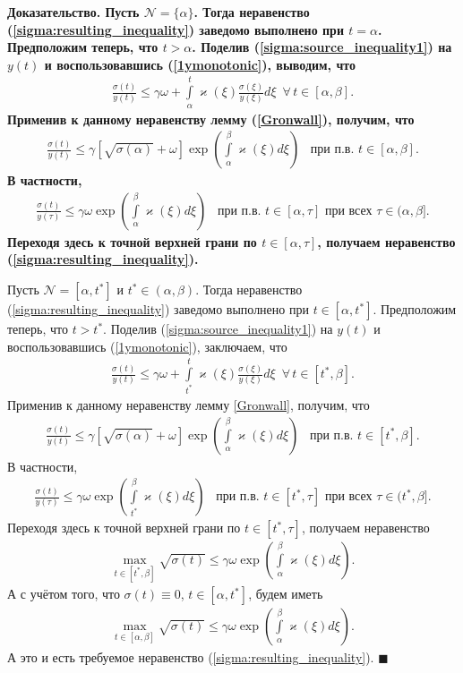 \documentclass{report}
\newenvironment{Proof}{\par\noindent\bf Доказательство.\rm}{ $\blacksquare$\par}
\begin{document}
\begin{Proof}
Пусть $\mathcal{N}=\{\alpha\}$. Тогда неравенство (\ref{sigma:resulting_inequality}) заведомо выполнено при $t=\alpha$. Предположим теперь, что $t>\alpha$.  Поделив
(\ref{sigma:source_inequality1}) на $y(t)$ и воспользовавшись (\ref{1ymonotonic}), выводим, что
\begin{gather*}
\frac{\sigma(t)}{y(t)}\leqslant\gamma\omega+\int\limits_\alpha^t\varkappa(\xi)\frac{\sigma(\xi)}{y(\xi)}d\xi\,\,\,\forall\,t\in[\alpha,\beta].
\end{gather*}
Применив к данному неравенству лемму (\ref{Gronwall}), получим, что
\begin{gather*}
\frac{\sigma(t)}{y(t)}\leqslant\gamma[\sqrt{\sigma(\alpha)}+\omega] \exp\left(\int\limits_\alpha^\beta\varkappa(\xi)d\xi\right)\,\,\,\mbox{ при п.в. $t\in[\alpha,\beta]$}.
\end{gather*}
В частности,
\begin{gather*}
\frac{\sigma(t)}{y(\tau)}\leqslant\gamma\omega \exp\left(\int\limits_\alpha^\beta\varkappa(\xi)d\xi\right)\,\,\,\mbox{ при п.в. $t\in[\alpha,\tau]$ при всех $\tau\in(\alpha,\beta]$}.
\end{gather*}
Переходя здесь к точной верхней грани по $t\in[\alpha,\tau]$, получаем неравенство (\ref{sigma:resulting_inequality}).

Пусть $\mathcal{N}=[\alpha,t^*]$ и $t^*\in(\alpha,\beta)$. Тогда неравенство (\ref{sigma:resulting_inequality}) заведомо выполнено при $t\in[\alpha,t^*]$. Предположим теперь, что $t>t^*$.
Поделив (\ref{sigma:source_inequality1}) на $y(t)$ и воспользовавшись (\ref{1ymonotonic}), заключаем, что
\begin{gather*}
\frac{\sigma(t)}{y(t)}\leqslant\gamma\omega+\int\limits_{t^*}^t\varkappa(\xi)\frac{\sigma(\xi)}{y(\xi)}d\xi\,\,\, \forall\,t\in[t^*,\beta].
\end{gather*}
Применив к данному неравенству лемму \ref{Gronwall}, получим, что
\begin{gather*}
\frac{\sigma(t)}{y(t)}\leqslant\gamma[\sqrt{\sigma(\alpha)}+\omega] \exp\left(\int\limits_\alpha^\beta\varkappa(\xi)d\xi\right)\,\,\,\mbox{ при п.в. $t\in[t^*,\beta]$}.
\end{gather*}
В частности,
\begin{gather*}
\frac{\sigma(t)}{y(\tau)}\leqslant\gamma\omega \exp\left(\int\limits_{t^*}^\beta\varkappa(\xi)d\xi\right)\,\,\,
\mbox{ при п.в. $t\in[t^*,\tau]$ при всех $\tau\in(t^*,\beta]$}.
\end{gather*}
Переходя здесь к точной верхней грани по $t\in[t^*,\tau]$, получаем неравенство
\begin{gather*}
\max\limits_{t\in[t^*,\beta]}\sqrt{\sigma(t)}\leqslant\gamma\omega \exp\left(\int\limits_{\alpha}^\beta\varkappa(\xi)d\xi\right).
\end{gather*}
А с учётом того, что $\sigma(t)\equiv0$, $t\in[\alpha,t^*]$, будем иметь
\begin{gather*}
\max\limits_{t\in[\alpha,\beta]}\sqrt{\sigma(t)}\leqslant\gamma\omega \exp\left(\int\limits_{\alpha}^\beta\varkappa(\xi)d\xi\right).
\end{gather*}
А это и есть требуемое неравенство (\ref{sigma:resulting_inequality}).
\end{Proof}
\end{document}
